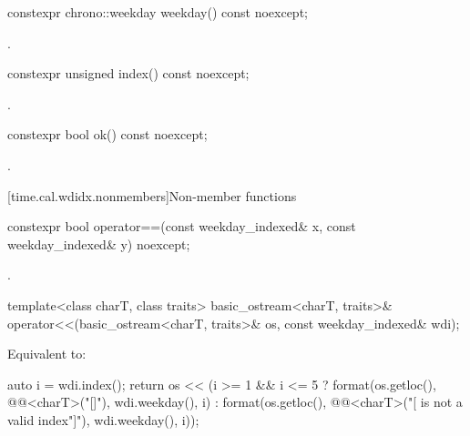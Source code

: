 %
\begin{itemdecl}
constexpr chrono::weekday weekday() const noexcept;
\end{itemdecl}

\begin{itemdescr}
\pnum
\returns
{}.
\end{itemdescr}

%
\begin{itemdecl}
constexpr unsigned index() const noexcept;
\end{itemdecl}

\begin{itemdescr}
\pnum
\returns
{}.
\end{itemdescr}

%
\begin{itemdecl}
constexpr bool ok() const noexcept;
\end{itemdecl}

\begin{itemdescr}
\pnum
\returns
{}.
\end{itemdescr}

[time.cal.wdidx.nonmembers]{Non-member functions}

%
\begin{itemdecl}
constexpr bool operator==(const weekday_indexed& x, const weekday_indexed& y) noexcept;
\end{itemdecl}

\begin{itemdescr}
\pnum
\returns
{}.
\end{itemdescr}

%
\begin{itemdecl}
template<class charT, class traits>
  basic_ostream<charT, traits>&
    operator<<(basic_ostream<charT, traits>& os, const weekday_indexed& wdi);
\end{itemdecl}

\begin{itemdescr}
\pnum
\effects
Equivalent to:
\begin{codeblock}
auto i = wdi.index();
return os << (i >= 1 && i <= 5 ?
  format(os.getloc(), @@<charT>("{}[{}]"), wdi.weekday(), i) :
  format(os.getloc(), @@<charT>("{}[{} is not a valid index"]"),
         wdi.weekday(), i));
\end{codeblock}
\end{itemdescr}

